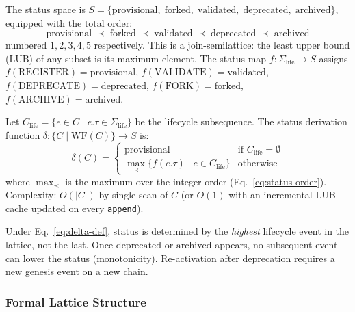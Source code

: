 The status space is $S = \{\text{provisional},\; \text{forked},\; \text{validated},\; \text{deprecated},\; \text{archived}\}$, equipped with the total order:
\begin{equation}\label{eq:status-order}
    \text{provisional} \;\prec\; \text{forked} \;\prec\; \text{validated} \;\prec\; \text{deprecated} \;\prec\; \text{archived}
\end{equation}
numbered $1, 2, 3, 4, 5$ respectively. This is a join-semilattice: the least upper bound (LUB) of any subset is its maximum element. The status map $f: \Sigma_{\text{life}} \to S$ assigns $f(\text{REGISTER}) = \text{provisional}$, $f(\text{VALIDATE}) = \text{validated}$, $f(\text{DEPRECATE}) = \text{deprecated}$, $f(\text{FORK}) = \text{forked}$, $f(\text{ARCHIVE}) = \text{archived}$.

Let $C_{\text{life}} = \{e \in C \mid e.\tau \in \Sigma_{\text{life}}\}$ be the lifecycle subsequence. The status derivation function $\delta: \{C \mid \text{WF}(C)\} \to S$ is:
\begin{equation}\label{eq:delta-def}
    \delta(C) = \begin{cases}
        \text{provisional} & \text{if } C_{\text{life}} = \emptyset \\
        \max_{\prec}\{ f(e.\tau) \mid e \in C_{\text{life}} \} & \text{otherwise}
    \end{cases}
\end{equation}
where $\max_{\prec}$ is the maximum over the integer order (Eq.~\ref{eq:status-order}). Complexity: $O(|C|)$ by single scan of $C$ (or $O(1)$ with an incremental LUB cache updated on every \texttt{append}).

Under Eq.~\ref{eq:delta-def}, status is determined by the \emph{highest} lifecycle event in the lattice, not the last. Once $\text{deprecated}$ or $\text{archived}$ appears, no subsequent event can lower the status (monotonicity). Re-activation after deprecation requires a new genesis event on a new chain.

\subsubsection{Formal Lattice Structure}\label{subsubsec:formal-lattice}

